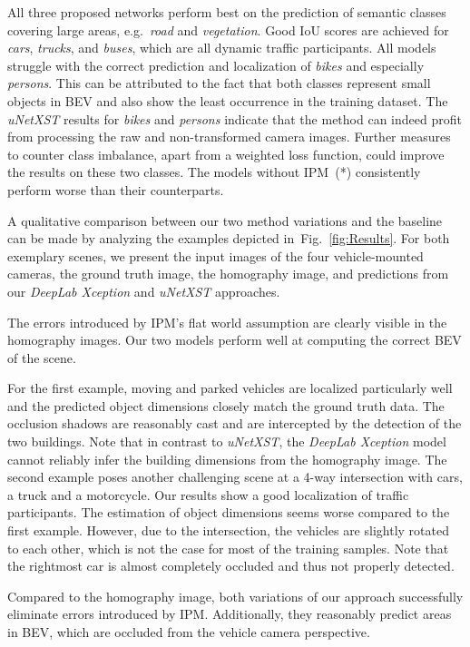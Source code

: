 \documentclass[a4paper, 10pt, conference]{ieeeconf}
\newcommand{\fig}[1]{Fig.~\ref{#1}}
\begin{document}
All three proposed networks perform best on the prediction of semantic classes covering large areas, e.g.\ \textit{road} and \textit{vegetation}. Good IoU scores are achieved for \textit{cars}, \textit{trucks}, and \textit{buses}, which are all dynamic traffic participants. All models struggle with the correct prediction and localization of \textit{bikes} and especially \textit{persons}. This can be attributed to the fact that both classes represent small objects in BEV and also show the least occurrence in the training dataset. The \textit{uNetXST} results for \textit{bikes} and \textit{persons} indicate that the method can indeed profit from processing the raw and non-transformed camera images. Further measures to counter class imbalance, apart from a weighted loss function, could improve the results on these two classes. The models without IPM~(*) consistently perform worse than their counterparts.

A qualitative comparison between our two method variations and the baseline can be made by analyzing the examples depicted in~\fig{fig:Results}. For both exemplary scenes, we present the input images of the four vehicle-mounted cameras, the ground truth image, the homography image, and predictions from our \textit{DeepLab Xception} and \textit{uNetXST} approaches.

The errors introduced by IPM's flat world assumption are clearly visible in the homography images. Our two models perform well at computing the correct BEV of the scene.

For the first example, moving and parked vehicles are localized particularly well and the predicted object dimensions closely match the ground truth data. The occlusion shadows are reasonably cast and are intercepted by the detection of the two buildings. Note that in contrast to \textit{uNetXST}, the \textit{DeepLab Xception} model cannot reliably infer the building dimensions from the homography image. The second example poses another challenging scene at a 4-way intersection with cars, a truck and a motorcycle. Our results show a good localization of traffic participants. The estimation of object dimensions seems worse compared to the first example. However, due to the intersection, the vehicles are slightly rotated to each other, which is not the case for most of the training samples. Note that the rightmost car is almost completely occluded and thus not properly detected.

Compared to the homography image, both variations of our approach successfully eliminate errors introduced by IPM. Additionally, they reasonably predict areas in BEV, which are occluded from the vehicle camera perspective.
\end{document}
